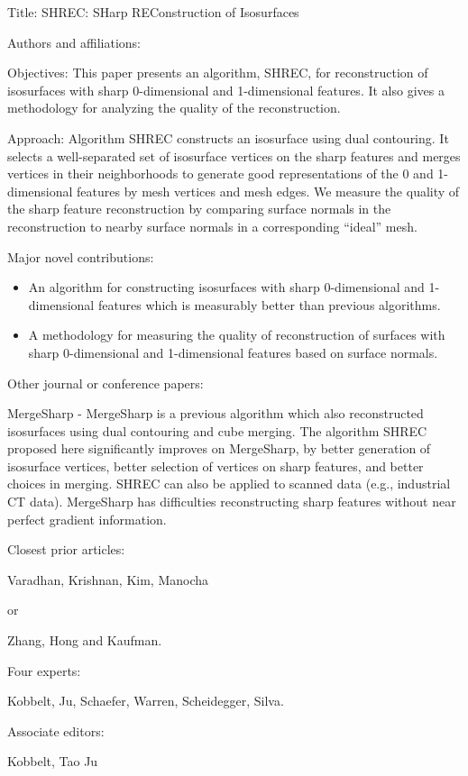 \documentclass{article}
\begin{document}
Title: SHREC: SHarp REConstruction of Isosurfaces

Authors and affiliations:

Objectives: This paper presents an algorithm, SHREC, for reconstruction 
of isosurfaces with sharp 0-dimensional and 1-dimensional features.
It also gives a methodology for analyzing the quality of the reconstruction.

Approach: Algorithm SHREC constructs an isosurface using dual contouring.
It selects a well-separated set of isosurface vertices on the sharp features
and merges vertices in their neighborhoods to generate good representations
of the 0 and 1-dimensional features by mesh vertices and mesh edges.
We measure the quality of the sharp feature reconstruction
by comparing surface normals in the reconstruction to nearby surface normals 
in a corresponding ``ideal'' mesh.

Major novel contributions:
\begin{itemize}
\item An algorithm for constructing isosurfaces with sharp 0-dimensional 
and 1-dimensional features which is measurably better than previous algorithms.
\item A methodology for measuring the quality of reconstruction of
surfaces with sharp 0-dimensional and 1-dimensional features
based on surface normals.
\end{itemize}

Other journal or conference papers:

MergeSharp - MergeSharp is a previous algorithm which also reconstructed
isosurfaces using dual contouring and cube merging.  The algorithm SHREC proposed here
significantly improves on MergeSharp, by better generation
of isosurface vertices, better selection of vertices on sharp features,
and better choices in merging.  SHREC can also be applied to scanned data
(e.g., industrial CT data).
MergeSharp has difficulties reconstructing sharp features
without near perfect gradient information.


Closest prior articles:

Varadhan, Krishnan, Kim, Manocha

or

Zhang, Hong and Kaufman.

Four experts:

Kobbelt, Ju, Schaefer, Warren, Scheidegger, Silva.

Associate editors:

Kobbelt, Tao Ju
\end{document}
